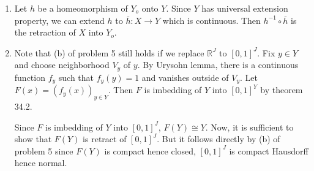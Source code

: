 \begin{problem}[6] \hfill

	\begin{enumerate}[label = (\alph*)]
		\item Let $h$ be a homeomorphism of $Y_o$ onto $Y$. Since $Y$ has universal extension property, we can extend $h$ to $\overline{h} : X \rightarrow Y$ which is continuous. Then $h^{-1} \circ \overline{h}$ is the retraction of $X$ into $Y_o$. 

		\item Note that (b) of problem 5 still holds if we replace $\mathbb{R}^J$ to $\left[ 0, 1 \right]^J$.
			Fix $y \in Y$ and choose neighborhood $V_y$ of $y$. By Urysohn lemma, there is a continuous function $f_y$ such that $f_y(y) = 1$ and vanishes outside of $V_y$. Let $F(x) = \left( f_y(x) \right)_{y\in Y}$. Then $F$ is imbedding of $Y$ into $\left[ 0, 1 \right]^{Y}$ by theorem 34.2.

			Since $F$ is imbedding of $Y$ into $\left[ 0, 1 \right]^J$, $F\left( Y \right) \cong Y$. Now, it is sufficient to show that $F\left( Y \right)$ is retract of $\left[ 0, 1 \right]^J$. But it follows directly by (b) of problem 5 since $F\left( Y \right)$ is compact hence closed, $\left[ 0, 1 \right]^J$ is compact Hausdorff hence normal.
	\end{enumerate}
	
\end{problem}
